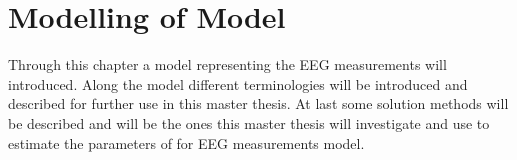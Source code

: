 \chapter{Modelling of Model}
Through this chapter a model representing the EEG measurements  will introduced. Along the model different terminologies will be introduced and described for further use in this master thesis. At last some solution methods will be described and will be the ones this master thesis will investigate and use to estimate the parameters of for EEG measurements model.
    

